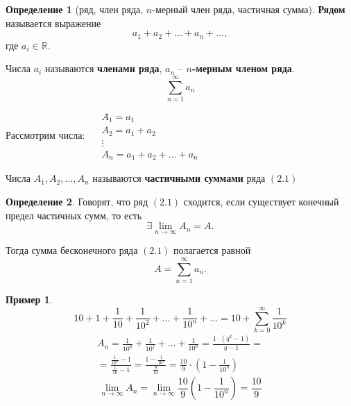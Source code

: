 \documentclass{report}
\theoremstyle{definition}
\newtheorem{definition}{Определение}[section]
\newtheorem{example}{Пример}
\begin{document}
\begin{definition}[ряд, член ряда, $n$-мерный член ряда, частичная сумма]
  \textbf{Рядом} называется выражение
  \begin{equation*}
    a_1 + a_2 + \ldots + a_n + \ldots,
  \end{equation*}
  где $a_i \in \mathbb{R}$.

  Числа $a_i$ называются \textbf{членами ряда}, $a_n$ -- \textbf{$n$-мерным членом ряда}.
  \begin{equation}
    \sum_{n=1}^{\infty}a_n
  \end{equation}

  Рассмотрим числа: $\quad \begin{array}{l}
      A_1 = a_1       \\
      A_2 = a_1 + a_2 \\
      \vdots          \\
      A_n = a_1 + a_2 + \ldots + a_n
    \end{array}$

  Числа $A_1,A_2,\ldots,A_n$ называются \textbf{частичными суммами} ряда $(2.1)$
\end{definition}

\begin{definition}
  Говорят, что ряд $(2.1)$ сходится, если существует конечный предел частичных сумм, то есть
  \begin{equation*}
    \exists \underset{n\rightarrow\infty}{\lim}A_n = A.
  \end{equation*}

  Тогда сумма бесконечного ряда $(2.1)$ полагается равной
  \begin{equation*}
    A = \sum_{n=1}^{\infty}a_n.
  \end{equation*}
\end{definition}

\begin{example}
  \item \begin{equation*}
    10 + 1 + \frac{1}{10} + \frac{1}{10^2} + \ldots + \frac{1}{10^n} + \ldots = 10 + \sum_{k=0}^{\infty}\frac{1}{10^k}
  \end{equation*}
  \begin{multline*}
    A_n = \frac{1}{10^0} + \frac{1}{10^1} + \ldots + \frac{1}{10^n} = \frac{1\cdot(q^k - 1)}{q - 1} = \\
    = \frac{\frac{1}{10^n} - 1}{\frac{1}{10} - 1} = \frac{1 - \frac{1}{10^n}}{\frac{9}{10}} = \frac{10}{9} \cdot (1 - \frac{1}{10^n})
  \end{multline*}
  \begin{equation*}
    \underset{n\rightarrow\infty}{\lim}A_n = \underset{n\rightarrow\infty}{\lim}\frac{10}{9}(1-\frac{1}{10^n}) = \frac{10}{9}
  \end{equation*}
\end{example}
\end{document}
